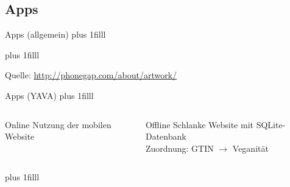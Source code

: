 \documentclass{beamer}
\begin{document}
\subsection*{Apps}
\begin{frame}{Apps (allgemein)}
	\vskip0pt plus 1filll
	\begin{center}
	\end{center}

	\vskip0pt plus 1filll
	\par\hrulefill\par
	\tiny{Quelle:
	\url{http://phonegap.com/about/artwork/}}
\end{frame}

\begin{frame}{Apps (YAVA)}
	\vskip0pt plus 1filll
	\begin{columns}
			\begin{exampleblock}{Online}
				Nutzung der mobilen Website
			\end{exampleblock}
			\begin{block}{Offline}
				Schlanke Website mit SQLite-Datenbank\\
				Zuordnung: GTIN $\rightarrow$ Veganität
			\end{block}
			\centering
	\end{columns}
	\vskip0pt plus 1filll
\end{frame}
\end{document}

